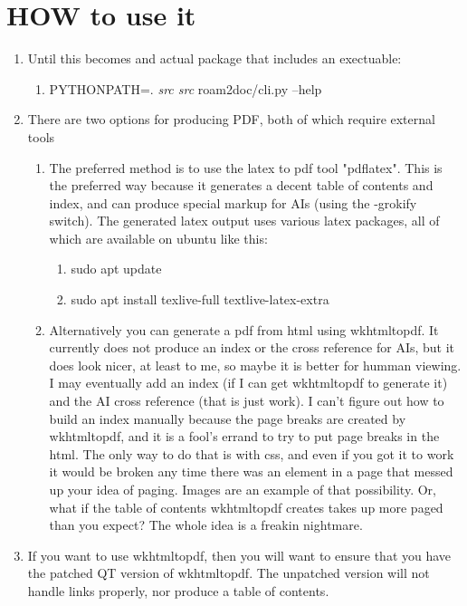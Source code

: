 \documentclass[11pt]{article}
\begin{document}
\section{HOW to use it  }
 \label{obj-67}
 \label{obj-66}
\begin{enumerate}
\item
Until this becomes and actual package that includes an exectuable:
\begin{enumerate}
\item
PYTHONPATH=.
\emph{src src}
roam2doc/cli.py --help
\end{enumerate}
\item
There are two options for producing PDF, both of which require external tools
\begin{enumerate}
\item
The preferred method is to use the latex to pdf tool
      "pdflatex". This is the preferred way because it generates a decent
      table of contents and index, and can produce special markup for AIs
      (using the -grokify switch). The generated latex output uses various latex
      packages, all of which are available on ubuntu like this:

\begin{enumerate}
\item
sudo apt update
\item
sudo apt install texlive-full textlive-latex-extra
\end{enumerate}
\item
Alternatively you can generate a pdf from html using wkhtmltopdf. It
      currently does not produce an index or the cross reference for AIs,
      but it does look nicer, at least to me, so maybe it is better
      for humman viewing. I may eventually add an index
      (if I can get wkhtmltopdf to generate it) and the AI cross
      reference (that is just work).
      I can't figure out how to build an index manually because the page
      breaks are created by wkhtmltopdf, and it is a fool's errand to try
      to put page breaks in the html. The only way to do that is with
      css, and even if you got it to work it would be broken any time
      there was an element in a page that messed up your idea of paging.
      Images are an example of that possibility. Or, what if the table
      of contents wkhtmltopdf creates takes up more paged than you expect?
      The whole idea is a freakin nightmare.

\end{enumerate}
\item
If you want to use wkhtmltopdf, then you
   will want to ensure that you have the patched QT version of wkhtmltopdf. The
   unpatched version will not handle links properly, nor produce a table of contents.


\end{enumerate}
\end{document}

